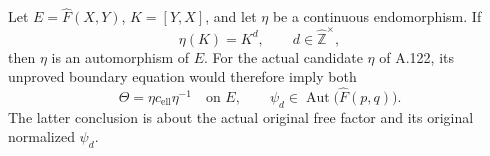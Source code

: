 Let \(E=\widehat F(X,Y)\), \(K=[Y,X]\), and let \(\eta\) be a
continuous endomorphism. If
\[
 \eta(K)=K^d,\qquad d\in\widehat{\mathbb Z}^{\times},            \tag{A.123.1}
\]
then \(\eta\) is an automorphism of \(E\).
For the actual candidate \(\eta\) of A.122, its unproved boundary
equation would therefore imply both
\[
 \Theta=\eta c_{\mathrm{ell}}\eta^{-1}
 \quad\text{on }E,\qquad
 \psi_d\in\operatorname{Aut}\bigl(\widehat F(p,q)\bigr).         \tag{A.123.2}
\]
The latter conclusion is about the actual original free factor
and its original normalized \(\psi_d\).

